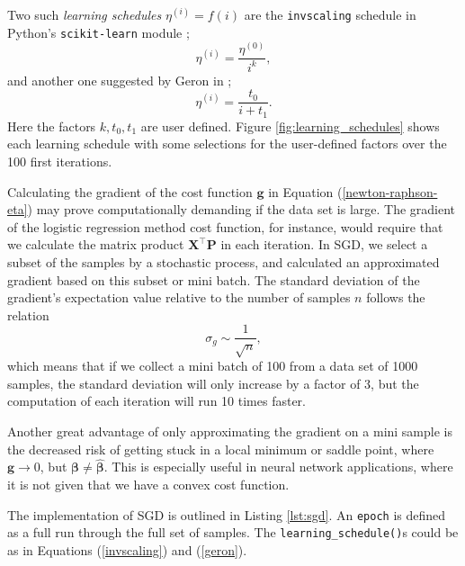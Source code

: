 \documentclass[]{article}
\begin{document}
Two such \textit{learning schedules} $\eta^{(i)} = f(i)$ are the \lstinline|invscaling| schedule in Python's \lstinline|scikit-learn| module \cite{skl};
\begin{equation} \label{invscaling}
	\eta^{(i)} = \frac{\eta^{(0)}}{i^k},
\end{equation}
and another one suggested by Geron in \cite{geron2019hands};
\begin{equation} \label{geron}
	\eta^{(i)} = \frac{t_0}{i + t_1}.
\end{equation}
Here the factors $k, t_0, t_1$ are user defined. Figure \ref{fig:learning_schedules} shows each learning schedule with some selections for the user-defined factors over the 100 first iterations.

\vspace{5mm}

Calculating the gradient of the cost function $\mathbf{g}$ in Equation (\ref{newton-raphson-eta}) may prove computationally demanding if the data set is large. The gradient of the logistic regression method cost function, for instance, would require that we calculate the matrix product $\mathbf{X}^\intercal \mathbf{P}$ in each iteration. In SGD, we select a subset of the samples by a stochastic process, and calculated an approximated gradient based on this subset or mini batch. The standard deviation of the gradient's expectation value relative to the number of samples $n$ follows the relation \cite{fys-stk4155-notes}
\begin{equation}
	\sigma_g \sim \frac{1}{\sqrt{n}},
\end{equation}
which means that if we collect a mini batch of 100 from a data set of 1000 samples, the standard deviation will only increase by a factor of 3, but the computation of each iteration will run 10 times faster.

Another great advantage of only approximating the gradient on a mini sample is the decreased risk of getting stuck in a local minimum or saddle point, where $\mathbf{g} \rightarrow 0$, but $\mathbf{\beta} \neq \mathbf{\hat{\beta}}$. This is especially useful in neural network applications, where it is not given that we have a convex cost function.

The implementation of SGD is outlined in Listing \ref{lst:sgd}. An \lstinline|epoch| is defined as a full run through the full set of samples. The \lstinline|learning_schedule()|s could be as in Equations (\ref{invscaling}) and (\ref{geron}). 

\vspace{5mm}
\end{document}
